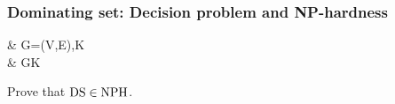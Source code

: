 \subsubsection{Dominating set: Decision problem and NP-hardness}
\begin{notesproblem}
 & \langle G=(V,E),K\rangle{}\\
 & GK
\end{notesproblem}

Prove that $\mathrm{DS}\in\mathrm{NPH}$.
